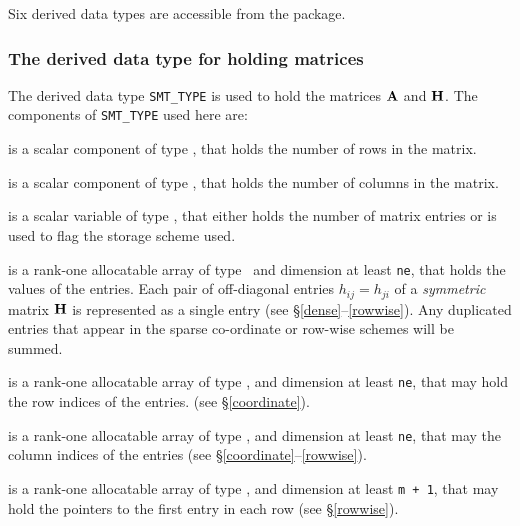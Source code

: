 \documentclass{galahad}
\begin{document}




\galtypes

Six derived data types are accessible from the package.


\subsubsection{The derived data type for holding matrices}\label{typesmt}
The derived data type {\tt SMT\_TYPE} is used to hold the matrices ${\mathbf{A}}$
and ${\mathbf{H}}$. The components of {\tt SMT\_TYPE} used here are:

\begin{description}

 is a scalar component of type \integer,
that holds the number of rows in the matrix.

 is a scalar component of type \integer,
that holds the number of columns in the matrix.

 is a scalar variable of type \integer, that either
holds the number of matrix entries or is used to flag the storage scheme
used.

 is a rank-one allocatable array of type \realdp\,
and dimension at least {\tt ne}, that holds the values of the entries.
Each pair of off-diagonal entries $h_{ij} = h_{ji}$ of a {\em symmetric}
matrix ${\mathbf{H}}$ is represented as a single entry
(see \S\ref{dense}--\ref{rowwise}).
Any duplicated entries that appear in the sparse
co-ordinate or row-wise schemes will be summed.

 is a rank-one allocatable array of type \integer,
and dimension at least {\tt ne}, that may hold the row indices of the entries.
(see \S\ref{coordinate}).

 is a rank-one allocatable array of type \integer,
and dimension at least {\tt ne}, that may the column indices of the entries
(see \S\ref{coordinate}--\ref{rowwise}).

 is a rank-one allocatable array of type \integer,
and dimension at least {\tt m + 1}, that may hold the pointers to
the first entry in each row (see \S\ref{rowwise}).

\end{description}
\end{document}
